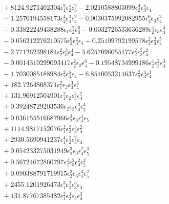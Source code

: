 \documentclass[10pt]{article}
\begin{document}
\begin{align*}
&{}  + 8124.9271402304 \epsilon_{1}^{3} \epsilon_{2}^{4} \epsilon_{3}^{2} - 2.0210588803099 \epsilon_{2}^{4} \epsilon_{3}^{4} \epsilon_{4} \\
&{}  - 1.2570194558173 \epsilon_{2}^{4} \epsilon_{3}^{3} \epsilon_{4}^{2} - 0.0030375992082955 \epsilon_{2}^{6} \epsilon_{3} \epsilon_{4}^{2} \\
&{}  - 0.33822249438288 \epsilon_{1} \epsilon_{2}^{2} \epsilon_{3}^{6} - 0.0032726533636289 \epsilon_{2}^{4} \epsilon_{3} \epsilon_{4}^{4} \\
&{}  - 0.056212276210575 \epsilon_{2}^{6} \epsilon_{3}^{2} \epsilon_{4} - 0.25109792199578 \epsilon_{2}^{2} \epsilon_{3}^{2} \epsilon_{4}^{5} \\
&{}  - 2.771262398184 \epsilon_{2}^{2} \epsilon_{3}^{3} \epsilon_{4}^{4} - 5.6257096055177 \epsilon_{2}^{2} \epsilon_{3}^{5} \epsilon_{4}^{2} \\
&{}  - 0.0014310299093417 \epsilon_{2}^{2} \epsilon_{3} \epsilon_{4}^{6} - 0.19548734999186 \epsilon_{2}^{4} \epsilon_{3}^{2} \epsilon_{4}^{3} \\
&{}  - 1.7030085188984 \epsilon_{2}^{2} \epsilon_{3}^{6} \epsilon_{4} - 6.8540053214637 \epsilon_{2}^{2} \epsilon_{3}^{4} \epsilon_{4}^{3} \\
&{}  + 182.7264808371 \epsilon_{1}^{2} \epsilon_{2} \epsilon_{3}^{3} \epsilon_{4}^{3} \\
&{}  + 131.96912504901 \epsilon_{1}^{2} \epsilon_{2} \epsilon_{3}^{4} \epsilon_{4}^{2} \\
&{}  + 0.39248729203536 \epsilon_{2} \epsilon_{3} \epsilon_{4}^{3} \epsilon_{5}^{4} \\
&{}  + 0.036155516687966 \epsilon_{2}^{3} \epsilon_{3} \epsilon_{4}^{4} \epsilon_{5} \\
&{}  + 1114.9817152076 \epsilon_{1}^{2} \epsilon_{2}^{2} \epsilon_{3}^{3} \epsilon_{4}^{2} \\
&{}  + 2930.5690941237 \epsilon_{1}^{4} \epsilon_{2}^{2} \epsilon_{3}^{2} \epsilon_{4} \\
&{}  + 0.054233275031949 \epsilon_{2}^{3} \epsilon_{3} \epsilon_{4}^{2} \epsilon_{5}^{3} \\
&{}  + 0.56724672860797 \epsilon_{2}^{3} \epsilon_{3}^{2} \epsilon_{4}^{2} \epsilon_{5}^{2} \\
&{}  + 0.090388791719915 \epsilon_{2}^{3} \epsilon_{3} \epsilon_{4}^{3} \epsilon_{5}^{2} \\
&{}  + 2455.1201926473 \epsilon_{1}^{3} \epsilon_{2}^{2} \epsilon_{3}^{3} \epsilon_{4} \\
&{}  + 131.87767385482 \epsilon_{1}^{2} \epsilon_{2}^{3} \epsilon_{3} \epsilon_{4}^{3} \\

\end{align*}
\end{document}
